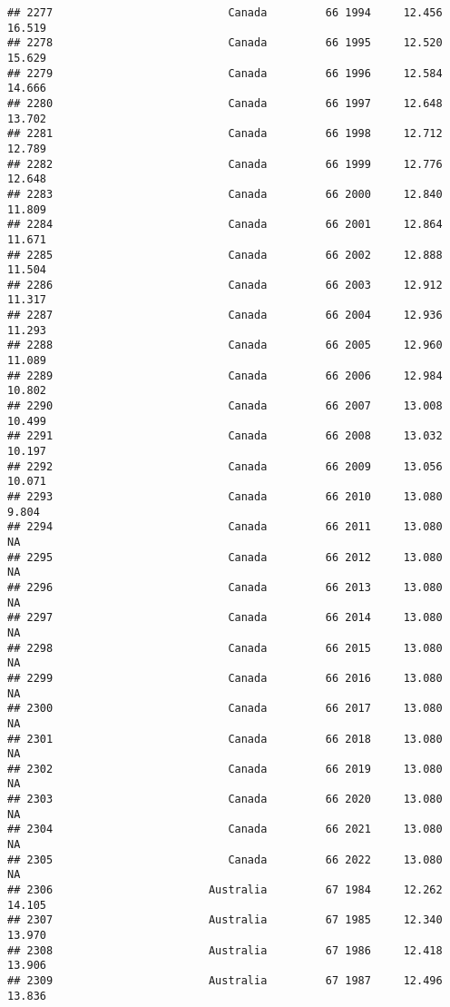 \documentclass[
]{article}
\begin{document}
\begin{verbatim}
## 2277                           Canada         66 1994     12.456     16.519
## 2278                           Canada         66 1995     12.520     15.629
## 2279                           Canada         66 1996     12.584     14.666
## 2280                           Canada         66 1997     12.648     13.702
## 2281                           Canada         66 1998     12.712     12.789
## 2282                           Canada         66 1999     12.776     12.648
## 2283                           Canada         66 2000     12.840     11.809
## 2284                           Canada         66 2001     12.864     11.671
## 2285                           Canada         66 2002     12.888     11.504
## 2286                           Canada         66 2003     12.912     11.317
## 2287                           Canada         66 2004     12.936     11.293
## 2288                           Canada         66 2005     12.960     11.089
## 2289                           Canada         66 2006     12.984     10.802
## 2290                           Canada         66 2007     13.008     10.499
## 2291                           Canada         66 2008     13.032     10.197
## 2292                           Canada         66 2009     13.056     10.071
## 2293                           Canada         66 2010     13.080      9.804
## 2294                           Canada         66 2011     13.080         NA
## 2295                           Canada         66 2012     13.080         NA
## 2296                           Canada         66 2013     13.080         NA
## 2297                           Canada         66 2014     13.080         NA
## 2298                           Canada         66 2015     13.080         NA
## 2299                           Canada         66 2016     13.080         NA
## 2300                           Canada         66 2017     13.080         NA
## 2301                           Canada         66 2018     13.080         NA
## 2302                           Canada         66 2019     13.080         NA
## 2303                           Canada         66 2020     13.080         NA
## 2304                           Canada         66 2021     13.080         NA
## 2305                           Canada         66 2022     13.080         NA
## 2306                        Australia         67 1984     12.262     14.105
## 2307                        Australia         67 1985     12.340     13.970
## 2308                        Australia         67 1986     12.418     13.906
## 2309                        Australia         67 1987     12.496     13.836

\end{verbatim}
\end{document}

